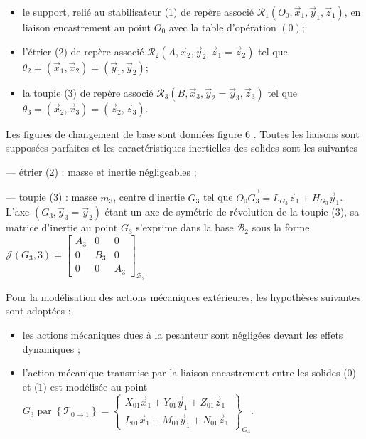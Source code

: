 \documentclass[10pt]{article}
\begin{document}
\begin{itemize}
  \item le support, relié au stabilisateur (1) de repère associé $\mathcal{R}_{1}\left(O_{0}, \vec{x}_{1}, \vec{y}_{1}, \vec{z}_{1}\right)$, en liaison encastrement au point $O_{0}$ avec la table d'opération $(0)$;

  \item l'étrier (2) de repère associé $\mathcal{R}_{2}\left(A, \vec{x}_{2}, \vec{y}_{2}, \vec{z}_{1}=\vec{z}_{2}\right)$ tel que $\theta_{2}=\left(\vec{x}_{1}, \vec{x}_{2}\right)=\left(\vec{y}_{1}, \vec{y}_{2}\right)$;

  \item la toupie (3) de repère associé $\mathcal{R}_{3}\left(B, \vec{x}_{3}, \vec{y}_{2}=\vec{y}_{3}, \vec{z}_{3}\right)$ tel que $\theta_{3}=\left(\vec{x}_{2}, \vec{x}_{3}\right)=\left(\vec{z}_{2}, \vec{z}_{3}\right)$.

\end{itemize}

Les figures de changement de base sont données figure 6 . Toutes les liaisons sont supposées parfaites et les caractéristiques inertielles des solides sont les suivantes

— étrier (2) : masse et inertie négligeables ;

— toupie (3) : masse $m_{3}$, centre d'inertie $G_{3}$ tel que $\overrightarrow{O_{0} G_{3}}=L_{G_{3}} \vec{z}_{1}+H_{G_{3}} \vec{y}_{1}$. L'axe $\left(G_{3}, \vec{y}_{3}=\vec{y}_{2}\right)$ étant un axe de symétrie de révolution de la toupie (3), sa matrice d'inertie au point $G_{3}$ s'exprime dans la base $\mathcal{B}_{2}$ sous la forme $\mathcal{J}\left(G_{3}, 3\right)=\left[\begin{array}{ccc}A_{3} & 0 & 0 \\ 0 & B_{3} & 0 \\ 0 & 0 & A_{3}\end{array}\right]_{\mathcal{B}_{2}}$

Pour la modélisation des actions mécaniques extérieures, les hypothèses suivantes sont adoptées :

\begin{itemize}
  \item les actions mécaniques dues à la pesanteur sont négligées devant les effets dynamiques ;

  \item l'action mécanique transmise par la liaison encastrement entre les solides (0) et (1) est modélisée au point $G_{3} \operatorname{par}\left\{\mathcal{T}_{0 \rightarrow 1}\right\}=\left\{\begin{array}{c}X_{01} \vec{x}_{1}+Y_{01} \vec{y}_{1}+Z_{01} \vec{z}_{1} \\ L_{01} \vec{x}_{1}+M_{01} \vec{y}_{1}+N_{01} \vec{z}_{1}\end{array}\right\}_{G_{3}}$.

\end{itemize}
\end{document}
